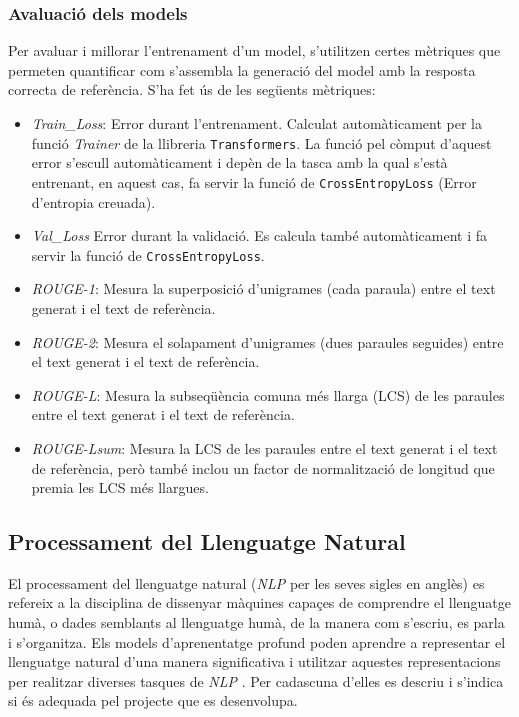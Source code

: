 \subsubsection{Avaluació dels models}
Per avaluar i millorar l'entrenament d'un model, s'utilitzen certes mètriques que permeten quantificar com s'assembla la generació del model amb la resposta correcta de referència. S'ha fet ús de les següents mètriques:
\begin{itemize}
    \item \textit{Train\_Loss}: Error durant l'entrenament. Calculat automàticament per la funció \textit{Trainer} de la llibreria \texttt{Transformers}. La funció pel còmput d'aquest error s'escull automàticament i depèn de la tasca amb la qual s'està entrenant, en aquest cas, fa servir la funció de \texttt{CrossEntropyLoss} (Error d'entropia creuada).
    \item \textit{Val\_Loss} Error durant la validació. Es calcula també automàticament i fa servir la funció de \texttt{CrossEntropyLoss}.
    \item \textit{ROUGE-1}: Mesura la superposició d'unigrames (cada paraula) entre el text generat i el text de referència.
    \item \textit{ROUGE-2}: Mesura el solapament d'unigrames (dues paraules seguides) entre el text generat i el text de referència.
    \item \textit{ROUGE-L}: Mesura la subseqüència comuna més llarga (LCS) de les paraules entre el text generat i el text de referència.
    \item \textit{ROUGE-Lsum}: Mesura la LCS de les paraules entre el text generat i el text de referència, però també inclou un factor de normalització de longitud que premia les LCS més llargues.
\end{itemize}

\subsection{Processament del Llenguatge Natural} \label{ssec:definicio_NLP}
El processament del llenguatge natural (\textit{NLP} per les seves sigles en anglès) es refereix a la disciplina de dissenyar màquines capaçes de comprendre el llenguatge humà, o dades semblants al llenguatge humà, de la manera com s'escriu, es parla i s'organitza. Els models d'aprenentatge profund poden aprendre a representar el llenguatge natural d'una manera significativa i utilitzar aquestes representacions per realitzar diverses tasques de \textit{NLP} \cite{Hugging-Face}. Per cadascuna d'elles es descriu i s'indica si és adequada pel projecte que es desenvolupa.

